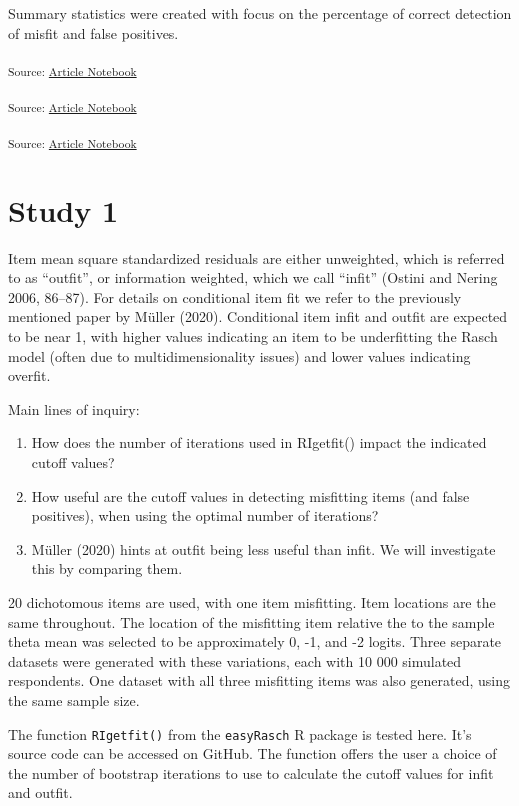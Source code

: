 \documentclass[
  letterpaper,
  DIV=11,
  numbers=noendperiod]{scrartcl}
\providecommand{\tightlist}{%
  \setlength{\itemsep}{0pt}\setlength{\parskip}{0pt}}\usepackage{longtable,booktabs,array}
\begin{document}
Summary statistics were created with focus on the percentage of correct
detection of misfit and false positives.

\textsubscript{Source:
\href{https://pgmj.github.io/rasch_itemfit/index.qmd.html}{Article
Notebook}}

\textsubscript{Source:
\href{https://pgmj.github.io/rasch_itemfit/index.qmd.html}{Article
Notebook}}

\textsubscript{Source:
\href{https://pgmj.github.io/rasch_itemfit/index.qmd.html}{Article
Notebook}}

\section{Study 1}\label{study-1}

Item mean square standardized residuals are either unweighted, which is
referred to as ``outfit'', or information weighted, which we call
``infit'' (Ostini and Nering 2006, 86--87). For details on conditional
item fit we refer to the previously mentioned paper by Müller (2020).
Conditional item infit and outfit are expected to be near 1, with higher
values indicating an item to be underfitting the Rasch model (often due
to multidimensionality issues) and lower values indicating overfit.

Main lines of inquiry:

\begin{enumerate}
\def\labelenumi{\arabic{enumi}.}
\tightlist
\item
  How does the number of iterations used in RIgetfit() impact the
  indicated cutoff values?
\item
  How useful are the cutoff values in detecting misfitting items (and
  false positives), when using the optimal number of iterations?
\item
  Müller (2020) hints at outfit being less useful than infit. We will
  investigate this by comparing them.
\end{enumerate}

20 dichotomous items are used, with one item misfitting. Item locations
are the same throughout. The location of the misfitting item relative
the to the sample theta mean was selected to be approximately 0, -1, and
-2 logits. Three separate datasets were generated with these variations,
each with 10 000 simulated respondents. One dataset with all three
misfitting items was also generated, using the same sample size.

The function \texttt{RIgetfit()} from the \texttt{easyRasch} R package
is tested here. It's source code can be accessed on GitHub. The function
offers the user a choice of the number of bootstrap iterations to use to
calculate the cutoff values for infit and outfit.
\end{document}
